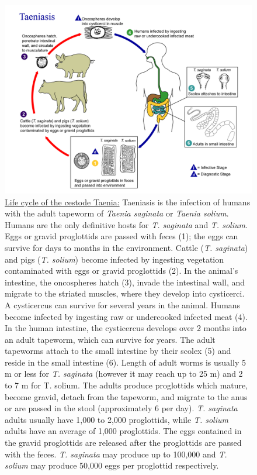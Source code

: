 \begin{figure}

{\centering \includegraphics[width=0.7\linewidth]{./figures/animals/Taenia_solium_Life_cycle} 

}

\caption{\href{https://commons.wikimedia.org/wiki/File:Taenia_solium_Life_cycle.tif}{Life cycle of the cestode Taenia:} Taeniasis is the infection of humans with the adult tapeworm of \emph{Taenia saginata} or \emph{Taenia solium}. Humans are the only definitive hosts for \emph{T. saginata} and \emph{T. solium}. Eggs or gravid proglottids are passed with feces (1); the eggs can survive for days to months in the environment. Cattle (\emph{T. saginata}) and pigs (\emph{T. solium}) become infected by ingesting vegetation contaminated with eggs or gravid proglottids (2). In the animal's intestine, the oncospheres hatch (3), invade the intestinal wall, and migrate to the striated muscles, where they develop into cysticerci. A cysticercus can survive for several years in the animal. Humans become infected by ingesting raw or undercooked infected meat (4). In the human intestine, the cysticercus develops over 2 months into an adult tapeworm, which can survive for years. The adult tapeworms attach to the small intestine by their scolex (5) and reside in the small intestine (6). Length of adult worms is usually 5 m or less for \emph{T. saginata} (however it may reach up to 25 m) and 2 to 7 m for T. solium. The adults produce proglottids which mature, become gravid, detach from the tapeworm, and migrate to the anus or are passed in the stool (approximately 6 per day). \emph{T. saginata} adults usually have 1,000 to 2,000 proglottids, while \emph{T. solium} adults have an average of 1,000 proglottids. The eggs contained in the gravid proglottids are released after the proglottids are passed with the feces. \emph{T. saginata} may produce up to 100,000 and \emph{T. solium} may produce 50,000 eggs per proglottid respectively.}\label{fig:taenialifecycle}
\end{figure}


